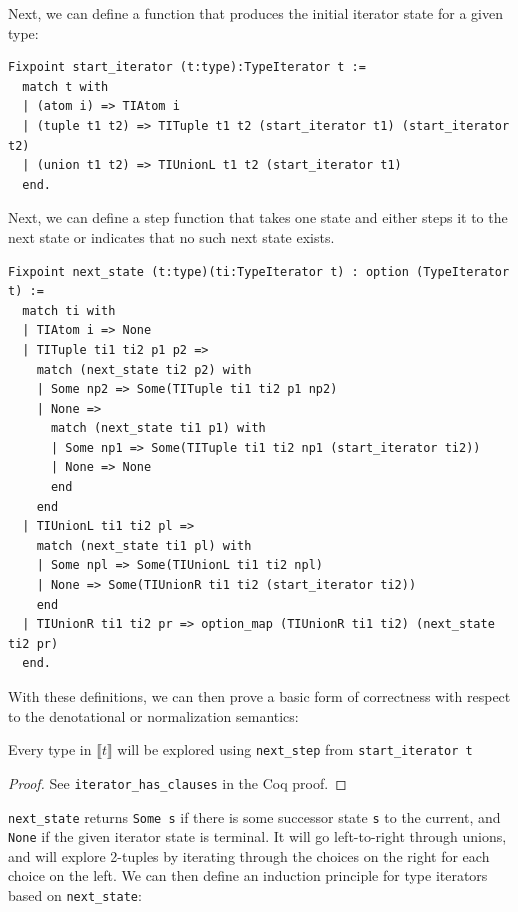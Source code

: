 \documentclass[a4paper,english]{lipics-v2018}
\newcommand{\denotes}[1]{\llbracket #1 \rrbracket}
\begin{document}
\noindent Next, we can define a function that produces the initial iterator state for a
given type:

\begin{small}
\begin{verbatim}
Fixpoint start_iterator (t:type):TypeIterator t :=
  match t with
  | (atom i) => TIAtom i
  | (tuple t1 t2) => TITuple t1 t2 (start_iterator t1) (start_iterator t2)
  | (union t1 t2) => TIUnionL t1 t2 (start_iterator t1)
  end.
\end{verbatim}
\end{small}

\noindent Next, we can define a step function that takes one state and either steps it
to the next state or indicates that no such next state exists.

\begin{small}\begin{verbatim}
Fixpoint next_state (t:type)(ti:TypeIterator t) : option (TypeIterator t) :=
  match ti with
  | TIAtom i => None
  | TITuple ti1 ti2 p1 p2 =>
    match (next_state ti2 p2) with
    | Some np2 => Some(TITuple ti1 ti2 p1 np2)
    | None =>
      match (next_state ti1 p1) with
      | Some np1 => Some(TITuple ti1 ti2 np1 (start_iterator ti2))
      | None => None
      end
    end
  | TIUnionL ti1 ti2 pl =>
    match (next_state ti1 pl) with
    | Some npl => Some(TIUnionL ti1 ti2 npl)
    | None => Some(TIUnionR ti1 ti2 (start_iterator ti2))
    end
  | TIUnionR ti1 ti2 pr => option_map (TIUnionR ti1 ti2) (next_state ti2 pr)
  end.
\end{verbatim}\end{small}

With these definitions, we can then prove a basic form of correctness with
respect to the denotational or normalization semantics:

\begin{theorem}
Every type in $\denotes{t}$ will be explored using \verb|next_step| from \verb|start_iterator t| 
\end{theorem}
\begin{proof}
See \verb|iterator_has_clauses| in the Coq proof.
\end{proof}

\verb|next_state| returns \verb|Some s| if there is some successor state
\verb|s| to the current, and \verb|None| if the given iterator state is
terminal. It will go left-to-right through unions, and will explore 2-tuples
by iterating through the choices on the right for each choice on the left. We can
then define an induction principle for type iterators based on \verb|next_state|:
\end{document}
